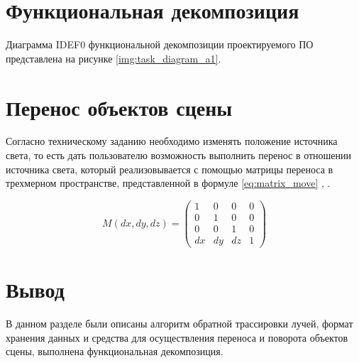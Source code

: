 \section{Функциональная декомпозиция}

Диаграмма IDEF0 функциональной декомпозиции проектируемого ПО представлена на рисунке \ref{img:task_diagram_a1}.


\section{Перенос объектов сцены}

Согласно техническому заданию необходимо изменять положение источника света, то есть дать пользователю возможность выполнить перенос в отношении источника света, который реализовывается с помощью матрицы переноса в трехмерном пространстве, представленной в формуле \ref{eq:matrix_move} \cite{куров}, \cite{боресков}.

\begin{equation}\label{eq:matrix_move}
	M(dx, dy, dz) = \begin{pmatrix}
		1 & 0 & 0 & 0 \\
		0 & 1 & 0 & 0 \\
		0 & 0 & 1 & 0 \\
		dx & dy & dz & 1
	\end{pmatrix}
\end{equation}

\section*{Вывод}

В данном разделе были описаны алгоритм обратной трассировки лучей, формат хранения данных и средства для осуществления переноса и поворота объектов сцены, выполнена функциональная декомпозиция.